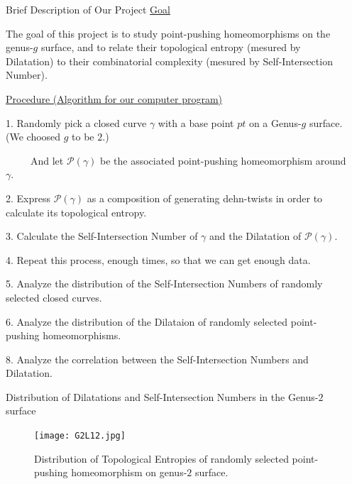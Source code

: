 \documentclass[leqno,presentation]{beamer}
\begin{document}
\begin{frame}
\begin{columns}[t]
\begin{column}[t]{.25\linewidth}
\end{column}

\begin{column}{.45\linewidth}

\begin{block}{Brief Description of Our Project}
\vspace{1ex}
\underline{Goal}

The goal of this project is to study point-pushing homeomorphisms on the genus-$g$ surface, and to relate their topological entropy (mesured by Dilatation) to their combinatorial complexity (mesured by Self-Intersection Number).
 
\underline{Procedure (Algorithm for our computer program)}

1. Randomly pick a closed curve $\gamma$ with a base point $pt$ on a Genus-$g$ surface. (We choosed $g$ to be $2$.)

~~~~~And let $\mathcal{P}(\gamma)$ be the associated point-pushing homeomorphism around $\gamma$.

2. Express $\mathcal{P}(\gamma)$ as a composition of generating dehn-twists in order to calculate its topological entropy.

3. Calculate the Self-Intersection Number of $\gamma$ and the Dilatation of $\mathcal{P}(\gamma)$.

4. Repeat this process, enough times, so that we can get enough data.

5. Analyze the distribution of the Self-Intersection Numbers of randomly selected closed curves.

6. Analyze the distribution of the Dilataion of randomly selected point-pushing homeomorphisms.

8. Analyze the correlation between the Self-Intersection Numbers and Dilatation.

\end{block}

\begin{block}{Distribution of Dilatations and Self-Intersection Numbers in the Genus-$2$ surface}
\vspace{1ex}
\begin{figure}
		\texttt{[image: G2L12.jpg]}
		\caption{Distribution of Topological Entropies of randomly selected point-pushing homeomorphism on genus-$2$ surface.}
\end{figure}
\end{block}


\end{column}
\end{columns}
\end{frame}
\end{document}
